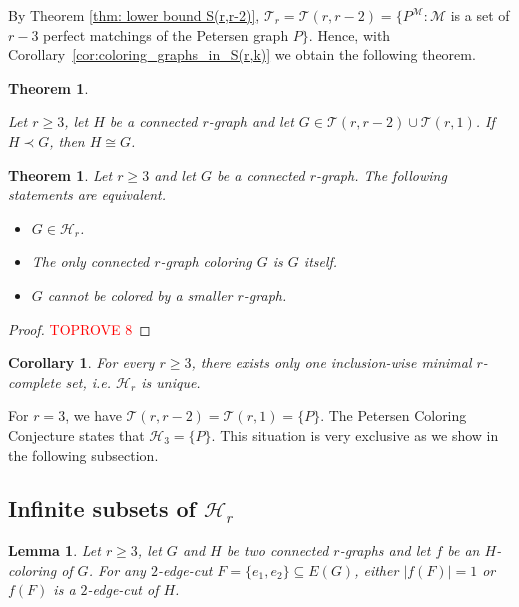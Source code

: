 \documentclass[a4paper,11pt]{article}
\newcommand{\ca}{\mathcal}
\newtheorem{theo}[defi]{Theorem}
\newtheorem{lem}[defi]{Lemma}
\newtheorem{cor}[defi]{Corollary}
\theoremstyle{remark}
\begin{document}
 By Theorem \ref{thm: lower bound S(r,r-2)}, $\ca T_r = \ca T(r,r-2) =\{P^{\ca M}\colon \ca M $ is a set of $r-3$ perfect matchings of the Petersen graph $ P\}$.
Hence, with Corollary~\ref{cor:coloring_graphs_in_S(r,k)} we obtain the following theorem.

\begin{theo}
\label{theo:coloring_P^M}


Let $r\geq3$, let $H$ be a connected $r$-graph and let $G\in \ca T(r,r-2)\cup \ca T(r,1)$. If $H \prec G$, then $H \cong G$.
\end{theo}

\begin{theo}
\label{theo:characterisation H_r}
	Let $r\ge3$ and let $G$ be a connected $r$-graph. The following statements are equivalent.
	\begin{itemize}
		\item[1)] $G\in\ca H_r$.
		\item[2)] The only connected $r$-graph coloring $G$ is $G$ itself.
		\item[3)] $G$ cannot be colored by a smaller $r$-graph.
	\end{itemize}
\end{theo}

\begin{proof}\textcolor{red}{TOPROVE 8}\end{proof}

\begin{cor}
For every $r \geq 3$, there exists only one inclusion-wise minimal $r$-complete set, i.e. $\ca H_r$ is unique.
\label{cor:H_r unique}
\end{cor}


For $r=3$, we have $\ca T(r,r-2)=\ca T(r,1) = \{P\}$. The Petersen Coloring Conjecture states that $\ca H_3=\{P\}$. This situation is very exclusive as we show in the following subsection.

\subsection{Infinite subsets of $\ca H_r$}



\begin{lem}\label{Lemma-2-cut-image}
	Let $r \geq 3$, let $G$ and $H$ be two connected $ r $-graphs and let $f$ be an $H$-coloring of $G$. For any $ 2 $-edge-cut $ F=\{e_1,e_2\}\subseteq E(G) $, either $ |f(F)|=1 $ or $ f(F) $ is a $2$-edge-cut of $ H $.
\end{lem}
\end{document}
